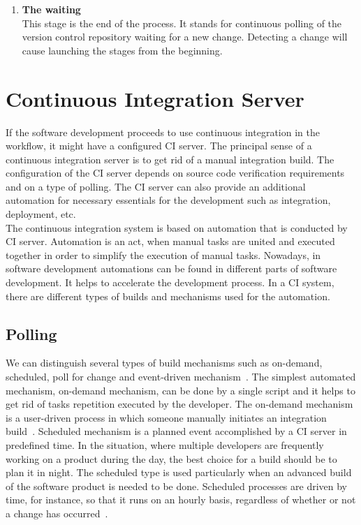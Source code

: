 \begin{enumerate}
    \item \textbf{The waiting}\\[0.1em]
          This stage is the end of the process. It stands for continuous polling of  the version control repository waiting for a new change. Detecting a change will cause launching the stages from the beginning.

\end{enumerate}

\section{Continuous Integration Server}

If the software development proceeds to use continuous integration in the workflow, it might have a configured CI server. The principal sense of a continuous integration server is to get rid of a manual integration build. The configuration of the CI server depends on source code verification requirements and on a type of polling. The CI server can also provide an additional automation for necessary essentials for the development such as integration, deployment, etc.\\

The continuous integration system is based on automation that is conducted by CI server. Automation is an act, when manual tasks are united and executed together in order to simplify the execution of manual tasks. Nowadays, in software development automations can be found in different parts of software development. It helps to accelerate the development process. In a CI system, there are different types of builds and mechanisms used for the automation.

\subsection{Polling}

We can distinguish several types of build mechanisms such as on-demand, scheduled, poll for change and event-driven mechanism~\cite{CIbook}. The simplest automated mechanism, on-demand mechanism, can be done by a single script and it helps to get rid of tasks repetition executed by the developer. The on-demand mechanism is a user-driven process in which someone manually initiates an integration build~\cite{CIbook}. Scheduled mechanism is a planned event accomplished by a CI server in predefined time. In the situation, where multiple developers are frequently working on a product during the day, the best choice for a build should be to plan it in night. The scheduled type is used particularly when an advanced build of the software product is needed to be done. Scheduled processes are driven by time, for instance, so that it runs on an hourly basis, regardless of whether or not a change has occurred~\cite{CIbook}.\\

